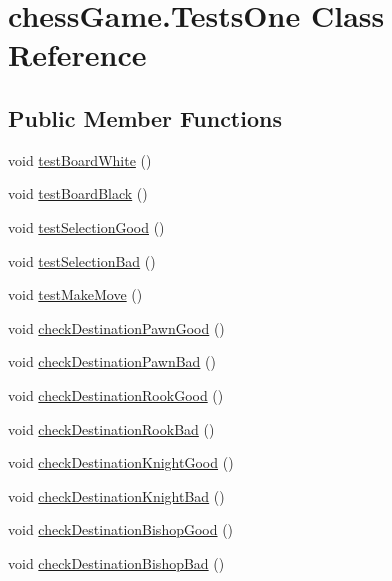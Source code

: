 \hypertarget{classchess_game_1_1_tests_one}{}\section{chess\+Game.\+Tests\+One Class Reference}
\label{classchess_game_1_1_tests_one}
\subsection*{Public Member Functions}
\begin{DoxyCompactItemize}
\item 
void \hyperlink{classchess_game_1_1_tests_one_a5ad1d4e10e2d9f7dd68ab8e1f98d30df}{test\+Board\+White} ()
\item 
void \hyperlink{classchess_game_1_1_tests_one_aa5af1f8650fba37708180074d50f9d12}{test\+Board\+Black} ()
\item 
void \hyperlink{classchess_game_1_1_tests_one_aea568b72ac003ecc7b6aef884c11ba1e}{test\+Selection\+Good} ()
\item 
void \hyperlink{classchess_game_1_1_tests_one_ac7e3b12d75a0134942a6d1b78cf93e6d}{test\+Selection\+Bad} ()
\item 
void \hyperlink{classchess_game_1_1_tests_one_a8fe235e622e35e564c11266c662aa1eb}{test\+Make\+Move} ()
\item 
void \hyperlink{classchess_game_1_1_tests_one_a761a9c74c24b69d572b83dc985ac0983}{check\+Destination\+Pawn\+Good} ()
\item 
void \hyperlink{classchess_game_1_1_tests_one_a5574aa9835757dbe5a9475e6dc299363}{check\+Destination\+Pawn\+Bad} ()
\item 
void \hyperlink{classchess_game_1_1_tests_one_aa9306477b5a3dcda3a5fcdf26cae704e}{check\+Destination\+Rook\+Good} ()
\item 
void \hyperlink{classchess_game_1_1_tests_one_a3a084e7f8ae5961032e344dc0971a30c}{check\+Destination\+Rook\+Bad} ()
\item 
void \hyperlink{classchess_game_1_1_tests_one_a433f857badf4ba90f5689af141834f2a}{check\+Destination\+Knight\+Good} ()
\item 
void \hyperlink{classchess_game_1_1_tests_one_abad959a4f06760f812cf016ea0f1c756}{check\+Destination\+Knight\+Bad} ()
\item 
void \hyperlink{classchess_game_1_1_tests_one_a8b2708dd6b64dbfc7387ba22844c9e9f}{check\+Destination\+Bishop\+Good} ()
\item 
void \hyperlink{classchess_game_1_1_tests_one_a4bac71560076146506952017cbe45a3f}{check\+Destination\+Bishop\+Bad} ()

\end{DoxyCompactItemize}
